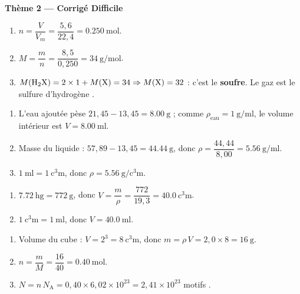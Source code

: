 \documentclass[11pt,a4paper]{article}
\begin{document}
\begin{center}{\large\bfseries\color{primarydark} Thème 2 — Corrigé Difficile}\end{center}

\begin{corrige}
\begin{enumerate}[label=\alph*)]
  \item $n = \dfrac{V}{V_m} = \dfrac{5{,}6}{22{,}4} = \SI{0.250}{\mole}$.
  \item $M = \dfrac{m}{n} = \dfrac{8{,}5}{0{,}250} = \SI{34}{\gram\per\mole}$.
  \item $M(\ce{H2X}) = 2\times 1 + M(\ce{X}) = 34 \Rightarrow M(\ce{X}) = 32$ : c'est le \textbf{soufre}.
        Le gaz est le sulfure d'hydrogène .
\end{enumerate}
\end{corrige}

\begin{corrige}
\begin{enumerate}[label=\alph*)]
  \item L'eau ajoutée pèse $21{,}45 - 13{,}45 = \SI{8.00}{\gram}$ ; comme $\rho_{\text{eau}} = \SI{1}{\gram\per\milli\litre}$,
        le volume intérieur est $V = \SI{8.00}{\milli\litre}$.
  \item Masse du liquide : $57{,}89 - 13{,}45 = \SI{44.44}{\gram}$, donc
        $\rho = \dfrac{44{,}44}{8{,}00} = \SI{5.56}{\gram\per\milli\litre}$.
  \item $\SI{1}{\milli\litre} = \SI{1}{\cubic\centi\metre}$, donc $\rho = \SI{5.56}{\gram\per\cubic\centi\metre}$.
\end{enumerate}
\end{corrige}

\begin{corrige}
\begin{enumerate}[label=\alph*)]
  \item $\SI{7.72}{\hecto\gram} = \SI{772}{\gram}$, donc $V = \dfrac{m}{\rho} = \dfrac{772}{19{,}3} = \SI{40.0}{\cubic\centi\metre}$.
  \item $\SI{1}{\cubic\centi\metre} = \SI{1}{\milli\litre}$, donc $V = \SI{40.0}{\milli\litre}$.
\end{enumerate}
\end{corrige}

\begin{corrige}
\begin{enumerate}[label=\alph*)]
  \item Volume du cube : $V = 2^3 = \SI{8}{\cubic\centi\metre}$, donc $m = \rho\,V = 2{,}0\times 8 = \SI{16}{\gram}$.
  \item $n = \dfrac{m}{M} = \dfrac{16}{40} = \SI{0.40}{\mole}$.
  \item $N = n\,N_{\mathrm{A}} = 0{,}40\times 6{,}02\times10^{23} = 2{,}41\times10^{23}$ motifs .
\end{enumerate}
\end{corrige}
\end{document}
